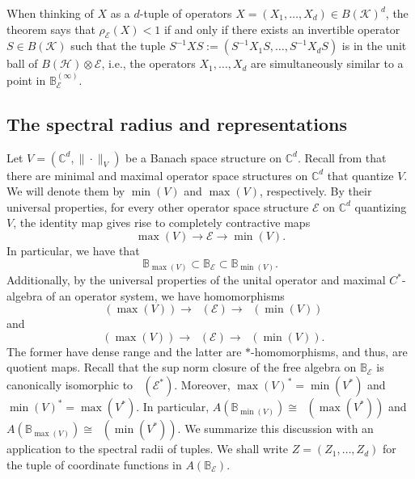 \documentclass[12pt]{amsart}
\numberwithin{equation}{section}
\theoremstyle{definition}
\newcommand{\cE}{\mathcal{E}}
\newcommand{\cH}{\mathcal{H}}
\newcommand{\cK}{\mathcal{K}}
\newcommand{\bB}{\mathbb{B}}
\newcommand{\C}{\mathbb{C}}
\DeclareMathOperator{\oa}{OA_u}
\DeclareMathOperator{\cmax}{C^*_{\max}}
\begin{document}
When thinking of $X$ as a $d$-tuple of operators $X = (X_1, \ldots, X_d) \in B(\cK)^d$, the theorem says that $\rho_\cE(X)<1$ if and only if there exists an invertible operator $S \in B(\cK)$ such that the tuple $S^{-1} XS := (S^{-1} X_1 S, \ldots, S^{-1} X_d S)$ is in the unit ball of $B(\cH) \otimes \cE$, i.e., the operators $X_1, \ldots, X_d$ are simultaneously similar to a point in $\bB_\cE^{(\infty)}$. 



\subsection{The spectral radius and representations}
Let $V = (\C^d, \|\cdot\|_V)$ be a Banach space structure on $\C^d$. Recall from \cite{PaulsenBook} that there are minimal and maximal operator space structures on $\C^d$ that quantize $V$. We will denote them by $\min(V)$ and $\max(V)$, respectively. By their universal properties, for every other operator space structure $\cE$ on $\C^d$ quantizing $V$, the identity map gives rise to completely contractive maps 
\[
\max(V) \to \cE \to \min(V). 
\]
In particular, we have that 
\[
\bB_{\max(V)} \subset \bB_{\cE} \subset \bB_{\min(V)}.
\]
Additionally, by the universal properties of the unital operator and maximal $C^*$-algebra of an operator system, we have homomorphisms 
\[
\oa(\max(V)) \to \oa(\cE) \to \oa(\min(V))
\]
and 
\[
\cmax(\max(V)) \to \cmax(\cE) \to \cmax(\min(V)). 
\]
The former have dense range and the latter are $*$-homomorphisms, and thus, are quotient maps. Recall that the sup norm closure of the free algebra on $\bB_{\cE}$ is canonically isomorphic to $\oa(\cE^*)$. Moreover, $\max(V)^* = \min(V^*)$ and $\min(V)^* = \max(V^*)$. In particular, $ A(\bB_{\min(V)}) \cong \oa(\max(V^*))$ and $A(\bB_{\max(V)}) \cong \oa(\min(V^*))$. We summarize this discussion with an application to the spectral radii of tuples. 
We shall write $Z = (Z_1, \ldots, Z_d)$ for the tuple of coordinate functions in $A(\bB_\cE)$. 
\end{document}
